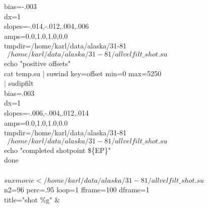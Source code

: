         bias=-.003 \ \\
        dx=1 \ \\
        slopes=-.014,-.012,.004,.006 \ \\
        amps=0.0,1.0,1.0,0.0 \ \\
        tmpdir=/home/karl/data/alaska/31-81 \ \\
    $\>\>/home/karl/data/alaska/31-81/allvelfilt\_shot.su$ \\
echo "positive offsets" \\
cat temp.su | suwind key=offset min=0 max=5250 \ \\
    $|$ sudipfilt \ \\
        bias=.003 \ \\
        dx=1 \ \\
        slopes=-.006,-.004,.012,.014 \ \\
        amps=0.0,1.0,1.0,0.0 \ \\
        tmpdir=/home/karl/data/alaska/31-81 \ \\
   $ \>\>/home/karl/data/alaska/31-81/allvelfilt\_shot.su$ \\
    echo "completed shotpoint \$\{EP\}" \\
done \\
 \\
$suxmovie </home/karl/data/alaska/31-81/allvelfilt\_shot.su$ \ \\
    n2=96 perc=.95 loop=1 fframe=100 dframe=1 \ \\
   title="shot \%g" \&